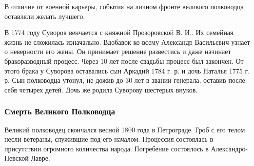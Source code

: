 В отличие от военной карьеры, события на личном фронте великого полководца оставляли желать лучшего.

В 1774 году Суворов венчается с княжной Прозоровской В. И.. Их семейная жизнь
не сложилась изначально. Вдобавок ко всему Александр Васильевич узнает о
неверности его жены. Он принимает решение развестись и даже начинает
бракоразводный процесс. Через 10 лет после свадьбы процесс был закончен. От
этого брака у Суворова оставались сын Аркадий 1784 г. р. и дочь Наталья 1775 г.
р. Сын полководца утонул, не дожив до 30 лет в звании генерала, оставив после
себя четырех детей. Дочь же родила Суворову шестерых внуков.

\subsubsection{Смерть Великого Полководца}

Великий полководец скончался весной 1800 года в Петрограде. Гроб с его телом
несли ветераны, служившие под его началом. Процессия состоялась в присутствии
огромного количества народа. Погребение состоялось в Александро-Невской Лавре.
